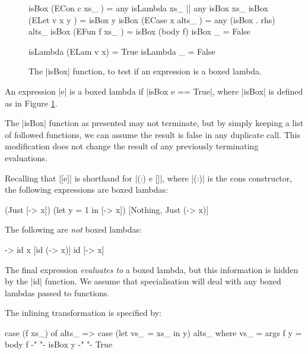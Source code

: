 \begin{figure}
\begin{code}
isBox (ECon c xs_     )  =  any isLambda xs_ ||  any isBox xs_
isBox (ELet v x y     )  =  isBox y
isBox (ECase x alts_  )  =  any (isBox . rhs) alts_
isBox (EFun f xs_     )  =  isBox (body f)
isBox _                  =  False

isLambda (ELam v x)  = True
isLambda _           = False
\end{code}
\caption{The |isBox| function, to test if an expression is a boxed lambda.}
\label{figF:boxed_lambda}
\end{figure}

\begin{definition}
An expression |e| is a boxed lambda if |isBox e == True|, where |isBox| is defined as in Figure \ref{figF:boxed_lambda}.
\end{definition}

The |isBox| function as presented may not terminate, but by simply keeping a list of followed functions, we can assume the result is false in any duplicate call. This modification does not change the result of any previously terminating evaluations.

\begin{example}
Recalling that |[e]| is shorthand for |(:) e []|, where |(:)| is the cons constructor, the following expressions are boxed lambdas:

\ignore\begin{code}
[\x -> x]
(Just [\x -> x])
(let y = 1 in [\x -> x])
[Nothing, Just (\x -> x)]
\end{code}

\noindent The following are \textit{not} boxed lambdas:

\ignore\begin{code}
\x -> id x
[id (\x -> x)]
id [\x -> x]
\end{code}

The final expression \textit{evaluates to} a boxed lambda, but this information is hidden by the |id| function. We assume that specialisation will deal with any boxed lambdas passed to functions.
\end{example}

\begin{definition}
The inlining transformation is specified by:

\ignore\begin{code}
case (f xs_) of alts_
    => case (let vs_ = xs_ in y) alts_
    where
        vs_ = args f
        y = body f
        {-"  "-} isBox y {-"  "-} True
\end{code}
\end{definition}

